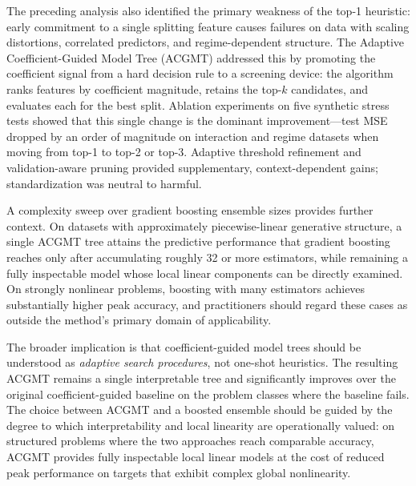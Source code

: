 \documentclass[11pt,a4paper]{article}
\begin{document}
The preceding analysis also identified the primary weakness of the top-1 heuristic: early commitment to a single splitting feature causes failures on data with scaling distortions, correlated predictors, and regime-dependent structure. The Adaptive Coefficient-Guided Model Tree (ACGMT) addressed this by promoting the coefficient signal from a hard decision rule to a screening device: the algorithm ranks features by coefficient magnitude, retains the top-$k$ candidates, and evaluates each for the best split. Ablation experiments on five synthetic stress tests showed that this single change is the dominant improvement---test MSE dropped by an order of magnitude on interaction and regime datasets when moving from top-1 to top-2 or top-3. Adaptive threshold refinement and validation-aware pruning provided supplementary, context-dependent gains; standardization was neutral to harmful.

A complexity sweep over gradient boosting ensemble sizes provides further context. On datasets with approximately piecewise-linear generative structure, a single ACGMT tree attains the predictive performance that gradient boosting reaches only after accumulating roughly 32 or more estimators, while remaining a fully inspectable model whose local linear components can be directly examined. On strongly nonlinear problems, boosting with many estimators achieves substantially higher peak accuracy, and practitioners should regard these cases as outside the method's primary domain of applicability.

The broader implication is that coefficient-guided model trees should be understood as \emph{adaptive search procedures}, not one-shot heuristics. The resulting ACGMT remains a single interpretable tree and significantly improves over the original coefficient-guided baseline on the problem classes where the baseline fails. The choice between ACGMT and a boosted ensemble should be guided by the degree to which interpretability and local linearity are operationally valued: on structured problems where the two approaches reach comparable accuracy, ACGMT provides fully inspectable local linear models at the cost of reduced peak performance on targets that exhibit complex global nonlinearity.


\end{document}
